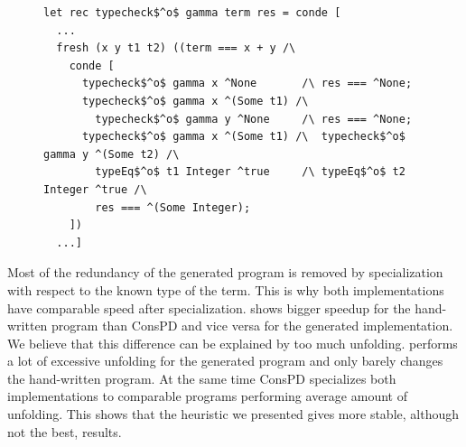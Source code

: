 \begin{figure}[!t]
  \centering
    \begin{lstlisting}[label={type:gen}, caption={A fragment of generated typechecker}, captionpos=b, frame=tb]
let rec typecheck$^o$ gamma term res = conde [
  ...
  fresh (x y t1 t2) ((term === x + y /\
    conde [
      typecheck$^o$ gamma x ^None       /\ res === ^None;
      typecheck$^o$ gamma x ^(Some t1) /\
        typecheck$^o$ gamma y ^None     /\ res === ^None;
      typecheck$^o$ gamma x ^(Some t1) /\  typecheck$^o$ gamma y ^(Some t2) /\
        typeEq$^o$ t1 Integer ^true     /\ typeEq$^o$ t2 Integer ^true /\
        res === ^(Some Integer);
    ])
  ...]
    \end{lstlisting}
\end{figure}

Most of the redundancy of the generated program is removed by specialization with respect to the known type of the term.
This is why both implementations have comparable speed after specialization.
\ecce shows bigger speedup for the hand-written program than ConsPD and vice versa for the generated implementation.
We believe that this difference can be explained by too much unfolding.
\ecce performs a lot of excessive unfolding for the generated program and only barely changes the hand-written program.
At the same time ConsPD specializes both implementations to comparable programs performing average amount of unfolding.
This shows that the heuristic we presented gives more stable, although not the best, results.
